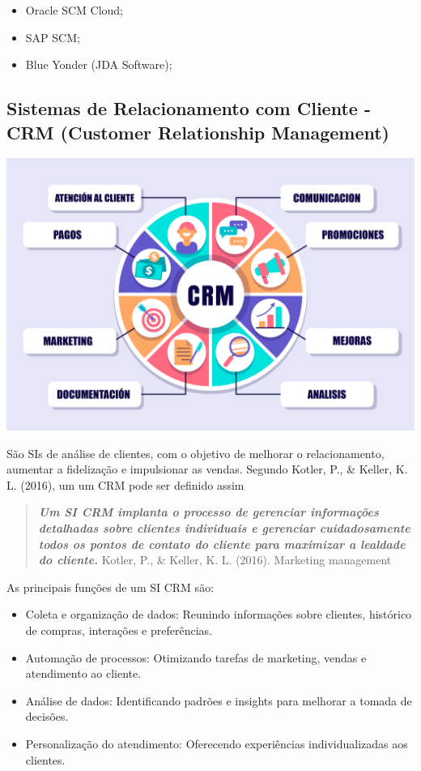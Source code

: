 \documentclass[
]{book}
\begin{document}
\begin{itemize}
\item
  Oracle SCM Cloud;
\item
  SAP SCM;
\item
  Blue Yonder (JDA Software);
\end{itemize}

\subsection{Sistemas de Relacionamento com Cliente - CRM (Customer Relationship Management)}\label{sistemas-de-relacionamento-com-cliente---crm-customer-relationship-management}

\includegraphics[width=6.6875in,height=\textheight]{images/sistemas/CRM.png}

São SIs de análise de clientes, com o objetivo de melhorar o relacionamento, aumentar a fidelização e impulsionar as vendas. Segundo Kotler, P., \& Keller, K. L. (2016), um um CRM pode ser definido assim

\begin{quote}
\textbf{\emph{Um SI CRM implanta o processo de gerenciar informações detalhadas sobre clientes individuais e gerenciar cuidadosamente todos os pontos de contato do cliente para maximizar a lealdade do cliente.}} Kotler, P., \& Keller, K. L. (2016). Marketing management
\end{quote}

As principais funções de um SI CRM são:

\begin{itemize}
\item
  Coleta e organização de dados: Reunindo informações sobre clientes, histórico de compras, interações e preferências.
\item
  Automação de processos: Otimizando tarefas de marketing, vendas e atendimento ao cliente.
\item
  Análise de dados: Identificando padrões e insights para melhorar a tomada de decisões.
\item
  Personalização do atendimento: Oferecendo experiências individualizadas aos clientes.
\end{itemize}
\end{document}
